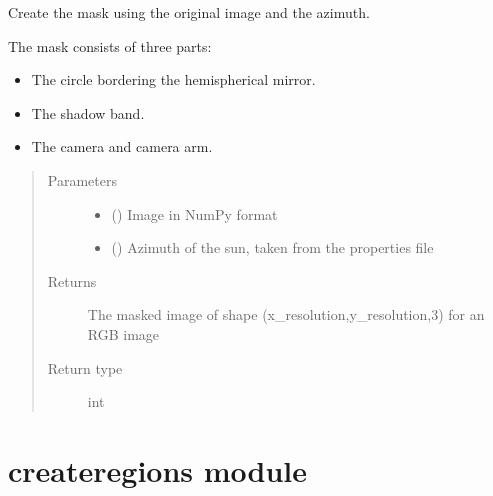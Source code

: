 \documentclass[letterpaper,10pt,english]{sphinxmanual}
\begin{document}
\begin{fulllineitems}
\label{\detokenize{createmask:createmask.create}}
Create the mask using the original image and the azimuth.

The mask consists of three parts:
\begin{itemize}
\item {} 
The circle bordering the hemispherical mirror.

\item {} 
The shadow band.

\item {} 
The camera and camera arm.

\end{itemize}
\begin{quote}\begin{description}
\item[{Parameters}] \leavevmode\begin{itemize}
\item {} 
 () \textendash{} Image in NumPy format

\item {} 
 () \textendash{} Azimuth of the sun, taken from the properties file

\end{itemize}

\item[{Returns}] \leavevmode
The masked image of shape (x\_resolution,y\_resolution,3) for an RGB image

\item[{Return type}] \leavevmode
int

\end{description}\end{quote}

\end{fulllineitems}



\section{createregions module}
\label{\detokenize{createregions:module-createregions}}\label{\detokenize{createregions::doc}}\label{\detokenize{createregions:createregions-module}}
\end{document}
